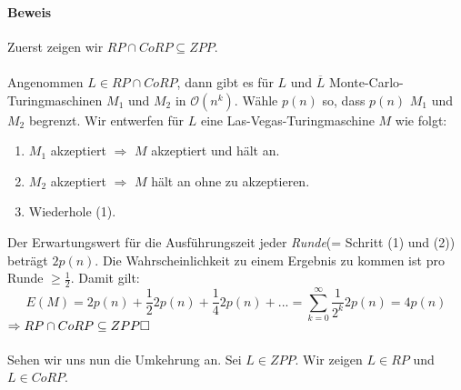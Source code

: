 \paragraph{Beweis}
Zuerst zeigen wir $RP \cap CoRP \subseteq ZPP$.\\
\\
Angenommen $L \in RP \cap CoRP$, dann gibt es für $L$ und $\overline{L}$ Monte-Carlo-Turingmaschinen $M_1$ und $M_2$ in $\mathcal{O}(n^k)$.
Wähle $p(n)$ so, dass $p(n)$ $M_1$ und $M_2$ begrenzt.
Wir entwerfen für $L$ eine Las-Vegas-Turingmaschine $M$ wie folgt:
\begin{enumerate}
	\item $M_1$ akzeptiert $\Rightarrow$ $M$ akzeptiert und hält an.
	\item $M_2$ akzeptiert $\Rightarrow$ $M$ hält an ohne zu akzeptieren.
	\item Wiederhole (1).
\end{enumerate}
Der Erwartungswert für die Ausführungszeit jeder \emph{Runde}(= Schritt (1) und (2)) beträgt $2p(n)$.
Die Wahrscheinlichkeit zu einem Ergebnis zu kommen ist pro Runde $\geq \frac{1}{2}$.
Damit gilt:
\begin{equation*}
	E(M) = 2p(n) + \frac{1}{2}2p(n) + \frac{1}{4}2p(n) + ... = \sum\limits_{k=0}^{\infty}\frac{1}{2^k}2p(n) = 4p(n)
\end{equation*}
$\Rightarrow RP \cap CoRP \subseteq ZPP \hfill \Box$\\
\\
Sehen wir uns nun die Umkehrung an.
Sei $L \in ZPP$.
Wir zeigen $L \in RP$ und $L \in CoRP$.

